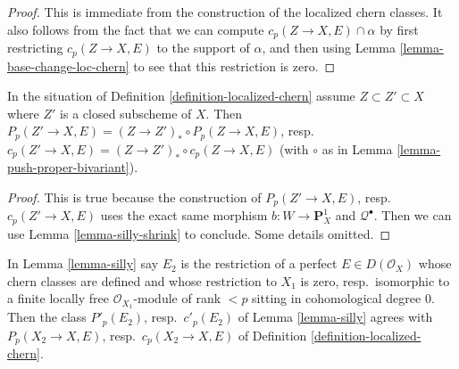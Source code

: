 \begin{proof}
This is immediate from the construction of the localized chern classes.
It also follows from the fact that we can compute
$c_p(Z \to X, E) \cap \alpha$ by first restricting $c_p(Z \to X, E)$ to
the support of $\alpha$, and then using Lemma \ref{lemma-base-change-loc-chern}
to see that this restriction is zero.
\end{proof}

\begin{lemma}
\label{lemma-loc-chern-shrink-Z}
In the situation of Definition \ref{definition-localized-chern}
assume $Z \subset Z' \subset X$ where $Z'$ is a closed subscheme of $X$.
Then
$P_p(Z' \to X, E) = (Z \to Z')_* \circ P_p(Z \to X, E)$,
resp.\ $c_p(Z' \to X, E) = (Z \to Z')_* \circ c_p(Z \to X, E)$
(with $\circ$ as in Lemma \ref{lemma-push-proper-bivariant}).
\end{lemma}

\begin{proof}
This is true because the construction of
$P_p(Z' \to X, E)$, resp.\ $c_p(Z' \to X, E)$
uses the exact same morphism $b : W \to \mathbf{P}^1_X$
and $\mathcal{Q}^\bullet$. Then we can use
Lemma \ref{lemma-silly-shrink} to conclude.
Some details omitted.
\end{proof}

\begin{lemma}
\label{lemma-loc-chern-agree}
In Lemma \ref{lemma-silly} say $E_2$ is the restriction of a perfect
$E \in D(\mathcal{O}_X)$ whose chern classes are defined and
whose restriction to $X_1$ is zero, resp.\ isomorphic to a
finite locally free $\mathcal{O}_{X_1}$-module
of rank $< p$ sitting in cohomological degree $0$. Then the
class $P'_p(E_2)$, resp.\ $c'_p(E_2)$ of Lemma \ref{lemma-silly} agrees with
$P_p(X_2 \to X, E)$, resp.\ $c_p(X_2 \to X, E)$ of
Definition \ref{definition-localized-chern}.
\end{lemma}

